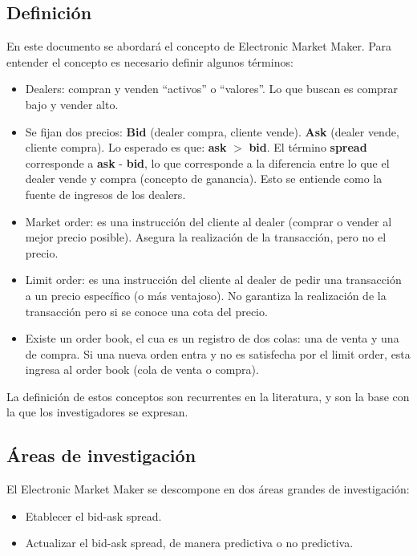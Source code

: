 \subsection{Definición}
En este documento se abordará el concepto de Electronic Market Maker. Para entender el concepto es necesario definir algunos términos: \cite{glosten1985bid}
\begin{itemize}
        \item Dealers: compran y venden ``activos'' o ``valores''. Lo que buscan es comprar bajo y vender alto.
        \item Se fijan dos precios: \textbf{Bid} (dealer compra, cliente vende). \textbf{Ask} (dealer vende, cliente compra). Lo esperado es que:
                \textbf{ask} $>$ \textbf{bid}. El término \textbf{spread} corresponde a \textbf{ask} - \textbf{bid}, lo que corresponde a la diferencia entre lo que
                el dealer vende y compra (concepto de ganancia). Esto se entiende como la fuente de ingresos de los dealers. \cite{ho1981optimal}
        \item Market order: es una instrucción del cliente al dealer (comprar o vender al mejor precio posible). Asegura la realización de la transacción,
                pero no el precio.
        \item Limit order: es una instrucción del cliente al dealer de pedir una transacción a un precio específico (o más ventajoso).
                No garantiza la realización de la transacción pero si se conoce una cota del precio.
        \item Existe un order book, el cua es un registro de dos colas: una de venta y una de compra. Si una nueva orden entra y no es satisfecha por el limit order,
                esta ingresa al order book (cola de venta o compra).
\end{itemize}

La definición de estos conceptos son recurrentes en la literatura, y son la base con la que los investigadores se expresan.

\subsection{Áreas de investigación}
El Electronic Market Maker se descompone en dos áreas grandes de investigación:
\begin{itemize}
        \item Etablecer el bid-ask spread.
        \item Actualizar el bid-ask spread, de manera predictiva o no predictiva.
\end{itemize}

